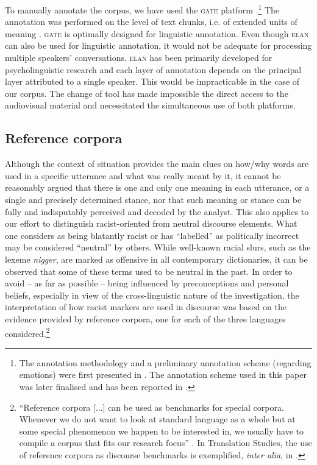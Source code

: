 \documentclass[output=paper]{LSP/langsci}
\begin{document}
To manually annotate the corpus, we have used the \textsc{gate} platform \citep{Cunningham2002}.\footnote{The annotation methodology and a preliminary annotation scheme (regarding emotions) were first presented in \citet{Mouka2012}. The annotation scheme used in this paper was later finalised and has been reported in \citet{Mouka2014}.} The annotation was performed on the level of text chunks, i.e. of extended units of meaning \citep{Sinclair1996a}. \textsc{gate} is optimally designed for linguistic annotation. Even though \textsc{elan} can also be used for linguistic annotation, it would not be adequate for processing multiple speakers' conversations. \textsc{elan} has been primarily developed for psycholinguistic research and each layer of annotation depends on the principal layer attributed to a single speaker. This would be impracticable in the case of our corpus. The change of tool has made impossible the direct access to the audiovisual material and necessitated the simultaneous use of both platforms.

\subsection{Reference corpora} \label{sec:2:3:3}

Although the context of situation provides the main clues on how/why words are used in a specific utterance and what was really meant by it, it cannot be reasonably argued that there is one and only one meaning in each utterance, or a single and precisely determined stance, nor that such meaning or stance can be fully and indisputably perceived and decoded by the analyst. This also applies to our effort to distinguish racist-oriented from neutral discourse elements. What one considers as being blatantly racist or has “labelled” as politically incorrect may be considered “neutral” by others. While well-known racial slurs, such as the lexeme \textit{nigger}, are marked as offensive in all contemporary dictionaries, it can be observed that some of these terms used to be neutral in the past. In order to avoid -- as far as possible -- being influenced by preconceptions and personal beliefs, especially in view of the cross-linguistic nature of the investigation, the interpretation of how racist markers are used in discourse was based on the evidence provided by reference corpora, one for each of the three languages considered.\footnote{“Reference corpora [...] can be used as benchmarks for special corpora. Whenever we do not want to look at standard language as a whole but at some special phenomenon we happen to be interested in, we usually have to compile a corpus that fits our research focus” \citep[68]{Teubert2007}. In Translation Studies, the use of reference corpora as discourse benchmarks is exemplified, \textit{inter alia}, in \citet[516]{Kenny1998}.}
\end{document}

